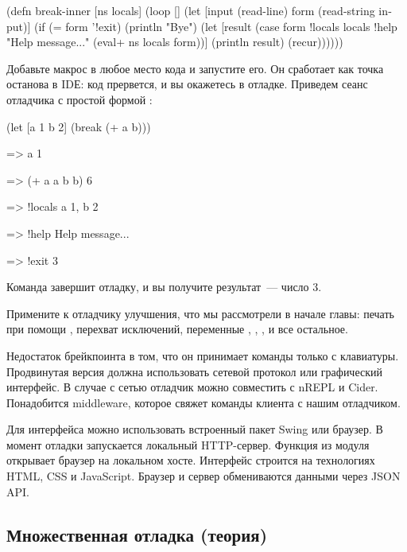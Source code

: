 \pagebreaklarge

\begin{english}
  \begin{clojure}
(defn break-inner [ns locals]
  (loop []
    (let [input (read-line)
          form (read-string input)]
      (if (= form '!exit)
        (println "Bye")
        (let [result
              (case form
                !locals locals
                !help "Help message..."
                (eval+ ns locals form))]
          (println result)
          (recur))))))
  \end{clojure}
\end{english}

Добавьте макрос  в любое место кода и запустите его. Он сработает как точка останова в IDЕ: код прервется, и вы окажетесь в отладке. Приведем сеанс отладчика с простой формой :

\begin{english}
  \begin{clojure}
(let [a 1 b 2]
  (break (+ a b)))

=> a
1

=> (+ a a b b)
6

=> !locals
{a 1, b 2}

=> !help
Help message...

=> !exit
3
  \end{clojure}
\end{english}

Команда  завершит отладку, и вы получите результат~--- число 3.

Примените к отладчику улучшения, что мы рассмотрели в начале главы: печать при помощи , перехват исключений, переменные , , ,  и все остальное.

Недостаток брейкпоинта в том, что он принимает команды только с клавиатуры. Продвинутая версия должна использовать сетевой протокол или графический интерфейс. В случае с сетью отладчик можно совместить с nREPL и Cider. Понадобится middleware, которое свяжет команды клиента с нашим отладчиком.

Для интерфейса можно использовать встроенный пакет Swing или браузер. В момент отладки запускается локальный HTTP-сервер. Функция  из модуля  открывает браузер на локальном хосте. Интерфейс строится на технологиях HTML, CSS и JavaScript. Браузер и сервер обмениваются данными через JSON API.

\subsection{Множественная отладка (теория)}

